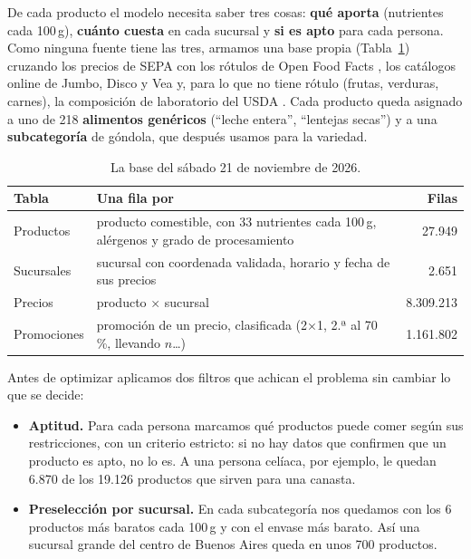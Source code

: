 \documentclass[10pt,a4paper]{article}
\begin{document}
De cada producto el modelo necesita saber tres cosas: \textbf{qué aporta}
(nutrientes cada 100\,g), \textbf{cuánto cuesta} en cada sucursal y \textbf{si es
apto} para cada persona. Como ninguna fuente tiene las tres, armamos una base propia
(Tabla~\ref{tab:base}) cruzando los precios de SEPA \cite{sepa} con los rótulos de
Open Food Facts \cite{off}, los catálogos online de Jumbo, Disco y Vea
\cite{catalogos} y, para lo que no tiene rótulo (frutas, verduras, carnes), la
composición de laboratorio del USDA \cite{usda}. Cada producto queda asignado a uno de
218 \textbf{alimentos genéricos} (``leche entera'', ``lentejas secas'') y a una
\textbf{subcategoría} de góndola, que después usamos para la variedad.

\begin{table}[H]
\centering\small
\caption{La base del sábado 21 de noviembre de 2026.}
\label{tab:base}
\begin{tabularx}{\linewidth}{@{}lXr@{}}
\toprule
\textbf{Tabla} & \textbf{Una fila por} & \textbf{Filas} \\
\midrule
Productos   & producto comestible, con 33 nutrientes cada 100\,g, alérgenos y grado de procesamiento & 27.949 \\
Sucursales  & sucursal con coordenada validada, horario y fecha de sus precios                    & 2.651 \\
Precios     & producto × sucursal                                                                  & 8.309.213 \\
Promociones & promoción de un precio, clasificada (2×1, 2.ª al 70\,\%, llevando $n$…)              & 1.161.802 \\
\bottomrule
\end{tabularx}
\end{table}

Antes de optimizar aplicamos dos filtros que achican el problema sin cambiar lo que
se decide:

\begin{itemize}
  \item \textbf{Aptitud.} Para cada persona marcamos qué productos puede comer según
        sus restricciones, con un criterio estricto: si no hay datos que confirmen
        que un producto es apto, no lo es. A una persona celíaca, por ejemplo, le
        quedan 6.870 de los 19.126 productos que sirven para una canasta.
  \item \textbf{Preselección por sucursal.} En cada subcategoría nos quedamos con los 6
        productos más baratos cada 100\,g y con el envase más barato. Así una
        sucursal grande del centro de Buenos Aires queda en unos 700 productos.
\end{itemize}
\end{document}
